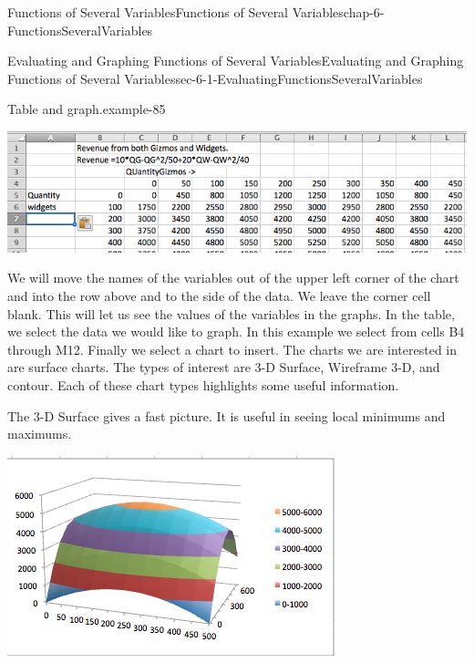 \documentclass[oneside,10pt,]{book}
\numberwithin{equation}{section}
\begin{document}
\begin{chapterptx}{Functions of Several Variables}{}{Functions of Several Variables}{}{}{chap-6-FunctionsSeveralVariables}
\begin{sectionptx}{Evaluating and Graphing Functions of Several Variables}{}{Evaluating and Graphing Functions of Several Variables}{}{}{sec-6-1-EvaluatingFunctionsSeveralVariables}
\begin{example}{Table and graph.}{example-85}
\begin{sidebyside}{1}{0}{0}{0}%
\begin{sbspanel}{1}%
\includegraphics[width=1\linewidth]{images/sec-6-1-10.png}
\end{sbspanel}%
\end{sidebyside}%
\par
\hypertarget{p-2140}{}%
We will move the names of the variables out of the upper left corner of the chart and into the row above and to the side of the data.  We leave the corner cell blank.  This will let us see the values of the variables in the graphs. In the table, we select the data we would like to graph.  In this example we select from cells B4 through M12.  Finally we select a chart to insert.  The charts we are interested in are surface charts.  The types of interest are 3-D Surface, Wireframe 3-D, and contour.  Each of these chart types highlights some useful information.%
\par
\hypertarget{p-2141}{}%
The 3-D Surface gives a fast picture.  It is useful in seeing local minimums and maximums.%
\begin{sidebyside}{1}{0.2}{0.2}{0}%
\begin{sbspanel}{0.6}%
\includegraphics[width=1\linewidth]{images/sec-6-1-11.png}
\end{sbspanel}%
\end{sidebyside}%
\par

\end{example}
\end{sectionptx}
\end{chapterptx}
\end{document}
